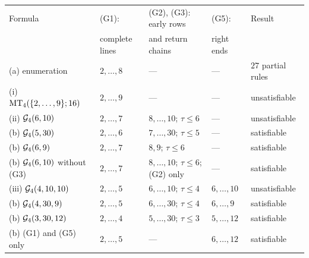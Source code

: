 \begin{tabular}{@{}lllll@{}}
\toprule
Formula & (G1): & (G2), (G3): early rows & (G5): & Result\\
& complete lines & and return chains & right ends &\\
\midrule
(a) enumeration & $2,\dots,8$ & --- & --- & $27$ partial rules\\
(i) $\mathrm{MT}_4(\{2,\dots,9\};16)$ & $2,\dots,9$ & --- & --- & unsatisfiable\\
\midrule
(ii) $\mathcal G_4(6,10)$ & $2,\dots,7$ & $8,\dots,10$; $\tau\le6$ & --- & unsatisfiable\\
(b) $\mathcal G_4(5,30)$ & $2,\dots,6$ & $7,\dots,30$; $\tau\le5$ & --- & satisfiable\\
(b) $\mathcal G_4(6,9)$ & $2,\dots,7$ & $8,9$; $\tau\le6$ & --- & satisfiable\\
(b) $\mathcal G_4(6,10)$ without (G3) & $2,\dots,7$ & $8,\dots,10$; $\tau\le6$; (G2) only & --- & satisfiable\\
\midrule
(iii) $\mathcal G_4(4,10,10)$ & $2,\dots,5$ & $6,\dots,10$; $\tau\le4$ & $6,\dots,10$ & unsatisfiable\\
(b) $\mathcal G_4(4,30,9)$ & $2,\dots,5$ & $6,\dots,30$; $\tau\le4$ & $6,\dots,9$ & satisfiable\\
(b) $\mathcal G_4(3,30,12)$ & $2,\dots,4$ & $5,\dots,30$; $\tau\le3$ & $5,\dots,12$ & satisfiable\\
(b) (G1) and (G5) only & $2,\dots,5$ & --- & $6,\dots,12$ & satisfiable\\
\bottomrule
\end{tabular}
